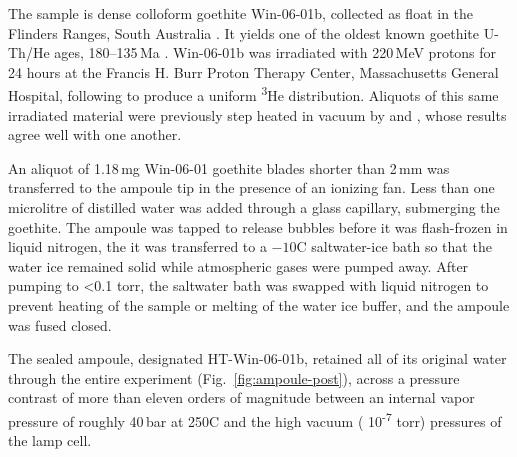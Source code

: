 The sample is dense colloform goethite Win-06-01b, collected as float in the Flinders Ranges, South Australia \citep{waltenberg2012,monteiro2017}. It yields one of the oldest known goethite U-Th/He ages, 180--135\,Ma \citep{waltenberg2012}. Win-06-01b was irradiated with 220\,MeV protons for 24 hours at the Francis H. Burr Proton Therapy Center, Massachusetts General Hospital, following \citet{shuster2005} to produce a uniform \textsuperscript{3}He distribution. Aliquots of this same irradiated material were previously step heated in vacuum by \citet{monteiro2017} and \citet{farley2024}, whose results agree well with one another. 

An aliquot of 1.18\,mg Win-06-01 goethite blades shorter than 2\,mm was transferred to the ampoule tip in the presence of an ionizing fan. Less than one microlitre of distilled water was added through a glass capillary, submerging the goethite. The ampoule was tapped to release bubbles before it was flash-frozen in liquid nitrogen, the it was transferred to a $-10$\textdegree C saltwater-ice bath so that the water ice remained solid while atmospheric gases were pumped away. After pumping to <0.1 torr, the saltwater bath was swapped with liquid nitrogen to prevent heating of the sample or melting of the water ice buffer, and the ampoule was fused closed. 

The sealed ampoule, designated HT-Win-06-01b, retained all of its original water through the entire experiment (Fig.~\ref{fig:ampoule-post}), across a pressure contrast of more than eleven orders of magnitude between an internal vapor pressure of roughly 40\,bar at 250\textdegree C \citep{haar1984} and the high vacuum ( 10\textsuperscript{-7} torr) pressures of the lamp cell.

